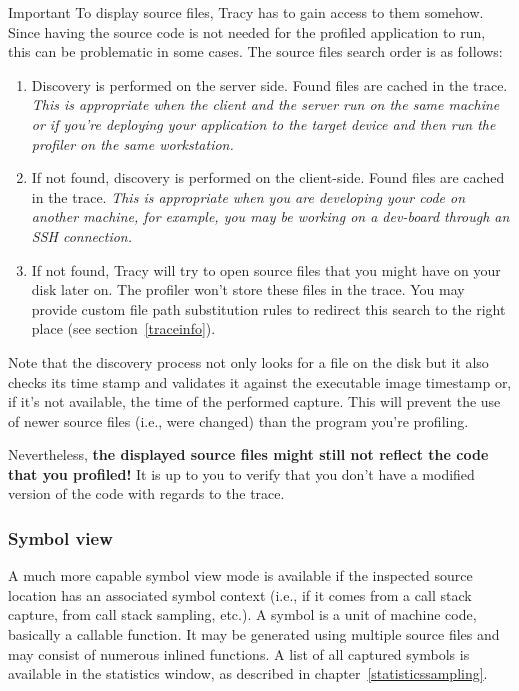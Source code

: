 \documentclass[hidelinks,titlepage,a4paper]{article}
\begin{document}
\begin{bclogo}[
noborder=true,
couleur=black!5,
logo=\bcbombe
]{Important}
To display source files, Tracy has to gain access to them somehow. Since having the source code is not needed for the profiled application to run, this can be problematic in some cases. The source files search order is as follows:

\begin{enumerate}
\item Discovery is performed on the server side. Found files are cached in the trace. \emph{This is appropriate when the client and the server run on the same machine or if you're deploying your application to the target device and then run the profiler on the same workstation.}
\item If not found, discovery is performed on the client-side. Found files are cached in the trace. \emph{This is appropriate when you are developing your code on another machine, for example, you may be working on a dev-board through an SSH connection.}
\item If not found, Tracy will try to open source files that you might have on your disk later on. The profiler won't store these files in the trace. You may provide custom file path substitution rules to redirect this search to the right place (see section~\ref{traceinfo}).
\end{enumerate}

Note that the discovery process not only looks for a file on the disk but it also checks its time stamp and validates it against the executable image timestamp or, if it's not available, the time of the performed capture. This will prevent the use of newer source files (i.e., were changed) than the program you're profiling.

Nevertheless, \textbf{the displayed source files might still not reflect the code that you profiled!} It is up to you to verify that you don't have a modified version of the code with regards to the trace.
\end{bclogo}

\subsubsection{Symbol view}
\label{symbolview}

A much more capable symbol view mode is available if the inspected source location has an associated symbol context (i.e., if it comes from a call stack capture, from call stack sampling, etc.). A symbol is a unit of machine code, basically a callable function. It may be generated using multiple source files and may consist of numerous inlined functions. A list of all captured symbols is available in the statistics window, as described in chapter~\ref{statisticssampling}.
\end{document}

